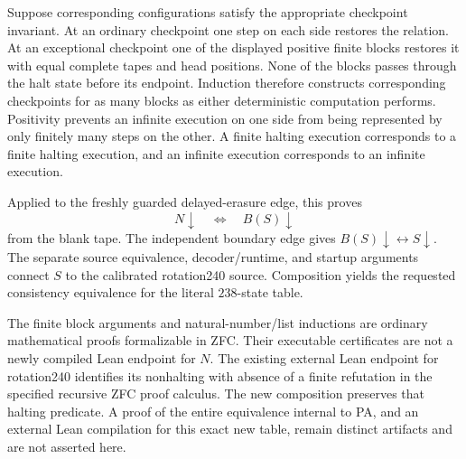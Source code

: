 Suppose corresponding configurations satisfy the appropriate
checkpoint invariant.  At an ordinary checkpoint one step on
each side restores the relation.  At an exceptional checkpoint
one of the displayed positive finite blocks restores it with
equal complete tapes and head positions.  None of the blocks
passes through the halt state before its endpoint.  Induction
therefore constructs corresponding checkpoints for as many
blocks as either deterministic computation performs.  Positivity
prevents an infinite execution on one side from being represented
by only finitely many steps on the other.  A finite halting
execution corresponds to a finite halting execution, and an
infinite execution corresponds to an infinite execution.

Applied to the freshly guarded delayed-erasure edge, this proves
\[
             N\downarrow\quad\Longleftrightarrow\quad B(S)\downarrow
\]
from the blank tape.  The independent boundary edge gives
$B(S)\downarrow\leftrightarrow S\downarrow$.  The separate source
equivalence, decoder/runtime, and startup arguments connect $S$
to the calibrated rotation240 source.  Composition yields the
requested consistency equivalence for the literal $238$-state table.

The finite block arguments and natural-number/list inductions are
ordinary mathematical proofs formalizable in ZFC.  Their executable
certificates are not a newly compiled Lean endpoint for $N$.
The existing external Lean endpoint for rotation240 identifies its
nonhalting with absence of a finite refutation in the specified
recursive ZFC proof calculus.  The new composition preserves that
halting predicate.  A proof of the entire equivalence internal to
PA, and an external Lean compilation for this exact new table,
remain distinct artifacts and are not asserted here.
